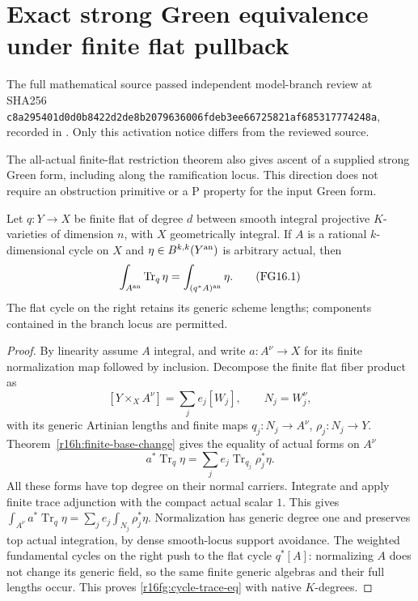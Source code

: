 \section{Exact strong Green equivalence under finite flat pullback}
\label{r16fg:section}

The full mathematical source passed independent model-branch
review at SHA256
\texttt{c8a295401d0d0b8422d2de8b2079636006fdeb3ee66725821af685317774248a},
recorded in
.
Only this activation notice differs from the reviewed source.

The all-actual finite-flat restriction theorem also gives ascent
of a supplied strong Green form, including along the ramification
locus. This direction does not require an obstruction primitive
or a P property for the input Green form.

\begin{lemma}
\label{r16fg:cycle-trace}
Let $q:Y\to X$ be finite flat of degree $d$ between smooth
integral projective $K$-varieties of dimension $n$, with $X$
geometrically integral. If $A$ is a rational $k$-dimensional
cycle on $X$ and $\eta\in B^{k,k}(Y^{\rm an})$ is arbitrary
actual, then
\[
                   \int_{A^{\rm an}}\operatorname{Tr}_q\eta
                          =\int_{(q^*A)^{\rm an}}\eta.
 \tag{FG16.1}\label{r16fg:cycle-trace-eq}
\]
The flat cycle on the right retains its generic scheme lengths;
components contained in the branch locus are permitted.
\end{lemma}

\begin{proof}
By linearity assume $A$ integral, and write
$a:A^\nu\to X$ for its finite normalization map followed by
inclusion. Decompose the finite flat fiber product as
\[
 [Y\times_XA^\nu]=\sum_j e_j[W_j],\qquad N_j=W_j^\nu,
\]
with its generic Artinian lengths and finite maps
$q_j:N_j\to A^\nu$, $\rho_j:N_j\to Y$.
Theorem~\ref{r16h:finite-base-change} gives the equality of
actual forms on $A^\nu$
\[
             a^*\operatorname{Tr}_q\eta
                   =\sum_j e_j\operatorname{Tr}_{q_j}\rho_j^*\eta.
\]
All these forms have top degree on their normal carriers.
Integrate and apply finite trace adjunction with the compact
actual scalar $1$. This gives
$\int_{A^\nu}a^*\operatorname{Tr}_q\eta
  =\sum_j e_j\int_{N_j}\rho_j^*\eta$.
Normalization has generic degree one and preserves top actual
integration, by dense smooth-locus support avoidance. The weighted
fundamental cycles on the right push to the flat cycle $q^*[A]$:
normalizing $A$ does not change its generic field, so the same
finite generic algebras and their full lengths occur.
This proves \eqref{r16fg:cycle-trace-eq} with native $K$-degrees.
\end{proof}

